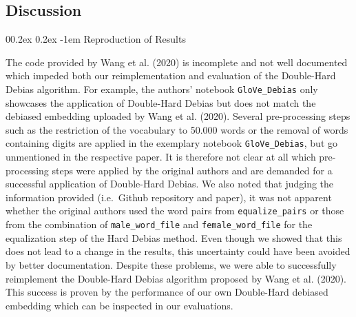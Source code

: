 \documentclass[
  english,
  man,floatsintext]{apa6}
\makeatletter
\let\oldparagraph\paragraph
\renewcommand{\paragraph}[1]{\oldparagraph{#1}\mbox{}}
\renewcommand{\paragraph}{\@startsection{paragraph}{4}{\parindent}%
  {0\baselineskip \@plus 0.2ex \@minus 0.2ex}%
  {-1em}%
  {\normalfont\normalsize\bfseries\itshape\typesectitle}}
\makeatother
\begin{document}
\hypertarget{discussion}{%
\subsection{Discussion}\label{discussion}}

\hypertarget{reproduction-of-results}{%
\paragraph{Reproduction of Results}\label{reproduction-of-results}}

The code provided by Wang et al. (2020) is incomplete and not well documented which impeded both our reimplementation and evaluation of the Double-Hard Debias algorithm. For example, the authors' notebook \texttt{GloVe\_Debias} only showcases the application of Double-Hard Debias but does not match the debiased embedding uploaded by Wang et al. (2020). Several pre-processing steps such as the restriction of the vocabulary to 50.000 words or the removal of words containing digits are applied in the exemplary notebook \texttt{GloVe\_Debias}, but go unmentioned in the respective paper. It is therefore not clear at all which pre-processing steps were applied by the original authors and are demanded for a successful application of Double-Hard Debias.
We also noted that judging the information provided (i.e.~Github repository and paper), it was not apparent whether the original authors used the word pairs from \texttt{equalize\_pairs} or those from the combination of \texttt{male\_word\_file} and \texttt{female\_word\_file} for the equalization step of the Hard Debias method. Even though we showed that this does not lead to a change in the results, this uncertainty could have been avoided by better documentation.
Despite these problems, we were able to successfully reimplement the Double-Hard Debias algorithm proposed by Wang et al. (2020). This success is proven by the performance of our own Double-Hard debiased embedding which can be inspected in our evaluations.
\end{document}
